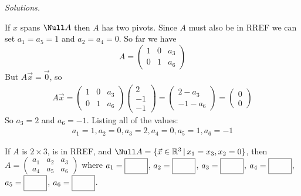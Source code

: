     \ifnum {} {\color{DarkBlue} \textit{Solutions.} 

    If $x$ spans $\Null A$ then $A$ has two pivots. Since $A$ must also be in RREF we can set $a_1=a_5=1$ and $a_2=a_4 = 0$. So far we have
    $$A = \begin{pmatrix} 1&0&a_3\\0&1&a_6\end{pmatrix}$$
    But $A\vec x = \vec 0$, so 
    \begin{align}
        A\vec x = \begin{pmatrix} 1&0&a_3\\0&1&a_6\end{pmatrix}\begin{pmatrix} 2\\-1\\-1\end{pmatrix} = \begin{pmatrix} 2-a_3 \\-1-a_6 \end{pmatrix} = \begin{pmatrix} 0\\0 \end{pmatrix}
    \end{align}
    So $a_3 = 2$ and $a_6 = -1$. Listing all of the values:
    \begin{align}
        a_1 = 1, a_2 = 0, a_3 = 2, a_4=0, a_5 = 1, a_6 = -1
    \end{align}
    } 
   \else
   \fi
\fi     


\ifnum {}
    If $A$ is $2 \times 3$, is in RREF, and $\Null A = \{ \vec x\in \mathbb R^3 \, | \, x_1=x_3, x_2 = 0\}$, then $A=\begin{pmatrix} a_1 & a_2 & a_3 \\ a_4 & a_5 & a_6 \end{pmatrix} $ where 
    $a_1 = \framebox{\strut\hspace{0.75cm}}$, 
    $a_2 = \framebox{\strut\hspace{0.75cm}}$, 
    $a_3 = \framebox{\strut\hspace{0.75cm}}$, 
    $a_4 = \framebox{\strut\hspace{0.75cm}}$,
    $a_5 = \framebox{\strut\hspace{0.75cm}}$,
    $a_6 = \framebox{\strut\hspace{0.75cm}}$.

